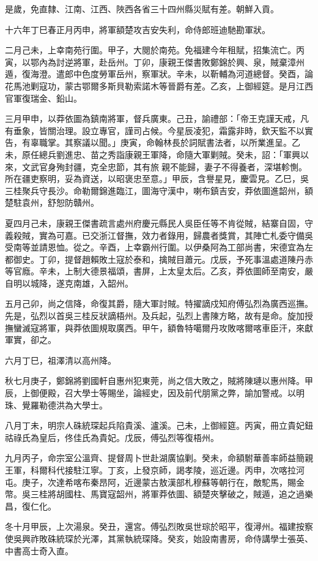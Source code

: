 \begin{pinyinscope}
是歲，免直隸、江南、江西、陜西各省三十四州縣災賦有差。朝鮮入貢。

十六年丁巳春正月丙申，將軍額楚攻吉安失利，命侍郎班迪馳勘軍狀。

二月己未，上幸南苑行圍。甲子，大閱於南苑。免福建今年租賦，招集流亡。丙寅，以鄂內為討逆將軍，赴岳州。丁卯，康親王傑書敗鄭錦於興、泉，賊棄漳州遁，復海澄。遣郎中色度勞軍岳州，察軍狀。辛未，以靳輔為河道總督。癸酉，論花馬池剿寇功，蒙古鄂爾多斯貝勒索諾木等晉爵有差。乙亥，上御經筵。是月江西官軍復瑞金、鉛山。

三月甲申，以莽依圖為鎮南將軍，督兵廣東。己丑，諭禮部：「帝王克謹天戒，凡有垂象，皆關治理。設立專官，謹司占候。今星辰凌犯，霜露非時，欽天監不以實告，有辜職掌。其察議以聞。」庚寅，命翰林長於詞賦書法者，以所業進呈。乙未，原任總兵劉進忠、苗之秀詣康親王軍降，命隨大軍剿賊。癸未，詔：「軍興以來，文武官身殉封疆，克全忠節，其有旅親不能歸，妻子不得養者，深堪軫惻。所在疆吏察明，妥為資送，以昭褒忠至意。」甲辰，含譽星見，慶雲見。乙巳，吳三桂聚兵守長沙。命勒爾錦進臨江，圖海守漢中，喇布鎮吉安，莽依圖進韶州，額楚駐袁州，舒恕防贛州。

夏四月己未，康親王傑書疏言處州府慶元縣民人吳臣任等不肯從賊，結寨自固，守義殺賊，實為可嘉。已交浙江督撫，效力者錄用，歸農者獎賞，其陣亡札委守備吳受南等並請恩恤。從之。辛酉，上幸霸州行圍。以伊桑阿為工部尚書，宋德宜為左都御史。丁卯，提督趙賴敗土寇於泰和，擒賊目蕭元。戊辰，予死事溫處道陳丹赤等官廕。辛未，上制大德景福頌，書屏，上太皇太后。乙亥，莽依圖師至南安，嚴自明以城降，遂克南雄，入韶州。

五月己卯，尚之信降，命復其爵，隨大軍討賊。特擢謫戍知府傅弘烈為廣西巡撫。先是，弘烈以首吳三桂反狀謫梧州。及兵起，弘烈上書陳方略，故有是命。旋加授撫蠻滅寇將軍，與莽依圖規取廣西。甲午，額魯特噶爾丹攻敗喀爾喀車臣汗，來獻軍實，卻之。

六月丁巳，祖澤清以高州降。

秋七月庚子，鄭錦將劉國軒自惠州犯東莞，尚之信大敗之，賊將陳璉以惠州降。甲辰，上御便殿，召大學士等賜坐，論經史，因及前代朋黨之弊，諭加警戒。以明珠、覺羅勒德洪為大學士。

八月丁未，明宗人硃統琛起兵陷貴溪、瀘溪。己未，上御經筵。丙寅，冊立貴妃鈕祜祿氏為皇后，佟佳氏為貴妃。戊辰，傅弘烈等復梧州。

九月丙子，命宗室公溫齊、提督周卜世赴湖廣協剿。癸未，命額駙華善率師益簡親王軍，科爾科代接駐江寧。丁亥，上發京師，謁孝陵，巡近邊。丙申，次喀拉河屯。庚子，次達希喀布秦昂阿，近邊蒙古敖漢部札穆蘇等朝行在，敵駝馬，賜金幣。吳三桂將胡國柱、馬寶寇韶州，將軍莽依圖、額楚夾擊破之，賊遁，追之過樂昌，復仁化。

冬十月甲辰，上次湯泉。癸丑，還宮。傅弘烈敗吳世琮於昭平，復潯州。福建按察使吳興祚敗硃統琛於光澤，其黨執統琛降。癸亥，始設南書房，命侍講學士張英、中書高士奇入直。


\end{pinyinscope}
